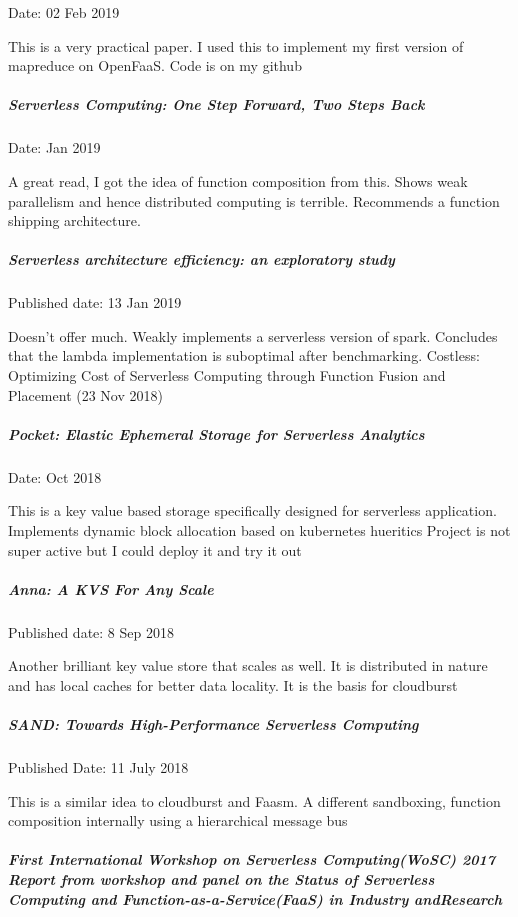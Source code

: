 \documentclass[12pt,titlepage]{article}
\begin{document}
Date: 02 Feb 2019

This is a very practical paper. I used this to implement my first version of mapreduce on OpenFaaS. Code is on my github

\subparagraph{Serverless Computing: One Step Forward, Two Steps Back}
\label{sec:orge8d3263}

Date: Jan 2019

A great read, I got the idea of function composition from this.
Shows weak parallelism and hence distributed computing is terrible.
Recommends a function shipping architecture.

\subparagraph{Serverless architecture efficiency: an exploratory study}
\label{sec:orga45aa9b}

Published date: 13 Jan 2019

Doesn’t offer much. Weakly implements a serverless version of spark.
Concludes that the lambda implementation is suboptimal after benchmarking.
Costless: Optimizing Cost of Serverless Computing through Function Fusion and Placement (23 Nov 2018)

\subparagraph{Pocket: Elastic Ephemeral Storage for Serverless Analytics}
\label{sec:orgbfdcb61}

Date: Oct 2018

This is a key value based storage specifically designed for serverless application. 
Implements dynamic block allocation based on kubernetes hueritics 
Project is not super active but I could deploy it and try it out

\subparagraph{Anna: A KVS For Any Scale}
\label{sec:orgb91b244}

Published date: 8 Sep 2018

Another brilliant key value store that scales as well. It is distributed in nature and has local caches for better data locality. It is the basis for cloudburst

\subparagraph{SAND: Towards High-Performance Serverless Computing}
\label{sec:org5a8d717}

Published Date: 11 July 2018

This is a similar idea to cloudburst and Faasm. A different sandboxing, function composition internally using a hierarchical message bus

\subparagraph{First ​​International​​ Workshop​​ on​​ Serverless Computing​​(WoSC) ​​2017 Report​​ from​​ workshop ​​and​​ panel ​​on ​​the​​ Status ​​of Serverless ​​Computing​​ and ​​Function-as-a-Service(FaaS) ​​in​​ Industry ​​and​​ Research}
\label{sec:orgb5e40e4}
\end{document}
